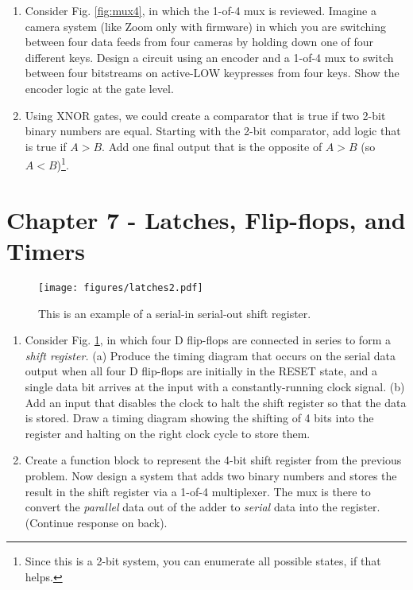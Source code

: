 \documentclass[10pt]{article}
\begin{document}
\begin{enumerate}
\item Consider Fig. \ref{fig:mux4}, in which the 1-of-4 mux is reviewed.  Imagine a camera system (like Zoom only with firmware) in which you are switching between four data feeds from four cameras by holding down one of four different keys.  Design a circuit using an encoder and a 1-of-4 mux to switch between four bitstreams on active-LOW keypresses from four keys. Show the encoder logic at the gate level.  \\ \vspace{3cm}
\item Using XNOR gates, we could create a comparator that is true if two 2-bit binary numbers are equal.  Starting with the 2-bit comparator, add logic that is true if $A>B$.  Add one final output that is the opposite of $A>B$ (so $A<B$)\footnote{Since this is a 2-bit system, you can enumerate all possible states, if that helps.}. \\ \vspace{3cm}
\end{enumerate}

\section{Chapter 7 - Latches, Flip-flops, and Timers}
\label{sec:latch}

\begin{figure}[ht]
\centering
\texttt{[image: figures/latches2.pdf]}
\caption{\label{fig:latches} This is an example of a serial-in serial-out shift register.}
\end{figure}

\begin{enumerate}
\item Consider Fig. \ref{fig:latches}, in which four D flip-flops are connected in series to form a \textit{shift register.}  (a) Produce the timing diagram that occurs on the serial data output when all four D flip-flops are initially in the RESET state, and a single data bit arrives at the input with a constantly-running clock signal.  (b) Add an input that disables the clock to halt the shift register so that the data is stored.  Draw a timing diagram showing the shifting of 4 bits into the register and halting on the right clock cycle to store them. \\ \vspace{3cm}
\item Create a function block to represent the 4-bit shift register from the previous problem.  Now design a system that adds two binary numbers and stores the result in the shift register via a 1-of-4 multiplexer.  The mux is there to convert the \textit{parallel} data out of the adder to \textit{serial} data into the register. (Continue response on back).
\end{enumerate}
\end{document}
